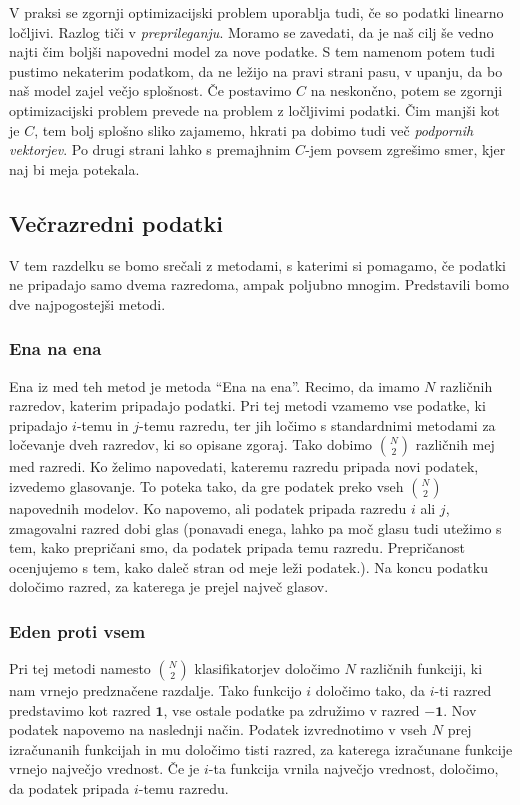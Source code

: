 \documentclass[mat1]{fmfdelo}
\newcommand{\pr}{\mathbf 1}
\newcommand{\nr}{\mathbf {-1}}
\begin{document}
 V praksi se zgornji optimizacijski problem uporablja tudi, če so podatki linearno ločljivi. Razlog tiči v \emph{preprileganju}. Moramo se zavedati, da je naš cilj še vedno najti čim boljši napovedni model za nove podatke. S tem namenom potem tudi pustimo nekaterim podatkom, da ne ležijo na pravi strani pasu, v upanju, da bo naš model zajel večjo splošnost. Če postavimo $C$ na neskončno, potem se zgornji optimizacijski problem prevede na problem z ločljivimi podatki. Čim manjši kot je $C$, tem bolj splošno sliko zajamemo, hkrati pa dobimo tudi več \emph{podpornih vektorjev}. Po drugi strani lahko s premajhnim $C$-jem povsem zgrešimo smer, kjer naj bi meja potekala. 

\subsection{Večrazredni podatki}
\label{poglavjeVecrazredniPodatki}
V tem razdelku se bomo srečali z metodami, s katerimi si pomagamo, če podatki ne pripadajo samo dvema razredoma, ampak poljubno mnogim. Predstavili bomo dve najpogostejši metodi. 
\subsubsection{Ena na ena}
Ena iz med teh metod je metoda ``Ena na ena''. Recimo, da imamo $N$ različnih razredov, katerim pripadajo podatki. Pri tej metodi vzamemo vse podatke, ki pripadajo $i$-temu in $j$-temu razredu, ter jih ločimo s standardnimi metodami za ločevanje dveh razredov, ki so opisane zgoraj. Tako dobimo $\binom{N}{2}$ različnih mej med razredi. Ko želimo napovedati, kateremu razredu pripada novi podatek, izvedemo glasovanje. To poteka tako, da gre podatek preko vseh $\binom{N}{2}$ napovednih modelov. Ko napovemo, ali podatek pripada razredu $i$ ali $j$, zmagovalni razred dobi glas (ponavadi enega, lahko pa moč glasu tudi utežimo s tem, kako prepričani smo, da podatek pripada temu razredu. Prepričanost ocenjujemo s tem, kako daleč stran od meje leži podatek.). Na koncu podatku določimo razred, za katerega je prejel največ glasov. 
\subsubsection{Eden proti vsem}\label{poglavjeEdenProtiVsem}
Pri tej metodi namesto $\binom{N}{2}$ klasifikatorjev določimo $N$ različnih funkciji, ki nam vrnejo predznačene razdalje. Tako funkcijo $i$ določimo tako, da $i$-ti razred predstavimo kot razred $\pr$, vse ostale podatke pa združimo v razred $\nr$. Nov podatek napovemo na naslednji način. Podatek izvrednotimo v vseh $N$ prej izračunanih funkcijah in mu določimo tisti razred, za katerega izračunane funkcije vrnejo največjo vrednost. Če je $i$-ta funkcija vrnila največjo vrednost, določimo, da podatek pripada $i$-temu razredu. 
\end{document}
